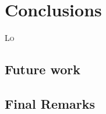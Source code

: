\chapter{Conclusions}
\label{chap:conclusions}

\lettrine[lines=4, findent=3pt, nindent=0pt]{L}{o} \textcolor{dimgray}{\lipsum[1-4]}

\section{Future work}
\label{sec:future-work}

\textcolor{dimgray}{\lipsum[1-3]}

\section{Final Remarks}
\label{sec:final-remarks}

\textcolor{dimgray}{\lipsum[1]}